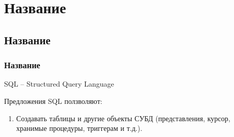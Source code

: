 \chapter{Название}



\section{Название}

\subsection{Название}

SQL -- Structured Query Language

Предложения SQL ползволяют:
\begin{enumerate}
  \item Создавать таблицы и другие объекты СУБД (представления, курсор, хранимые процедуры, триггерам и т.д.).
\end{enumerate}
